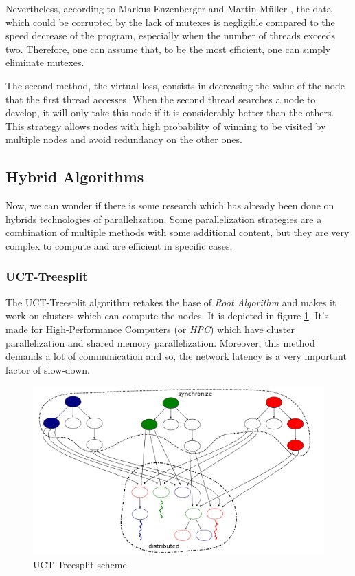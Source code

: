 Nevertheless, according to Markus Enzenberger and Martin Müller \cite{lock-free}, the data which could be corrupted by the lack of mutexes is negligible compared to the speed decrease of the program, especially when the number of threads exceeds two. Therefore, one can assume that, to be the most efficient, one can simply eliminate mutexes.
\newline

The second method, the virtual loss, consists in decreasing the value of the node that the first thread accesses. When the second thread searches a node to develop, it will only take this node if it is considerably better than the others. This strategy allows nodes with high probability of winning to be visited by multiple nodes and avoid redundancy on the other ones.

\subsection{Hybrid Algorithms}

Now, we can wonder if there is some research which has already been done on hybrids technologies of parallelization. Some parallelization strategies are a combination of multiple methods with some additional content, but they are very complex to compute and are efficient in specific cases.


\subsubsection{UCT-Treesplit}

The UCT-Treesplit algorithm\cite{treesplit} retakes the base of \emph{Root Algorithm} and makes it work on clusters which can compute the nodes. %
It is depicted in figure \ref{treesplit}. It’s made for High-Performance Computers (or \emph{HPC}) which have cluster parallelization and shared memory parallelization. Moreover, this method demands a lot of communication and so, the network latency is a very important factor of slow-down.

\begin{figure}[!h] 
\centerline{\includegraphics[scale=0.60]{2_State_of_the_art/Strategy_of_root_parallelization_Mikail/treesplit.png}}
   \caption{\label{étiquette} UCT-Treesplit scheme}
\label{treesplit}
\end{figure}

